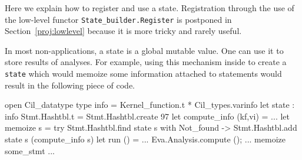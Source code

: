 Here we explain how to register and use a state. Registration through the use of
the low-level functor \texttt{State\_builder.Register} is postponed in
Section~\ref{proj:lowlevel} because it is more tricky and rarely useful.

In most non-\framac applications, a state is a global mutable value. One can use
it to store results of analyses. For example, using this mechanism inside
\framac to create a \texttt{state} which would memoize some
information attached to statements would result in the following piece of code.
 
 
\begin{ocamlcode}
open Cil_datatype
type info = Kernel_function.t * Cil_types.varinfo
let state : info Stmt.Hashtbl.t = Stmt.Hashtbl.create 97
let compute_info (kf,vi) = ...
let memoize s =
  try Stmt.Hashtbl.find state s
  with Not_found -> Stmt.Hashtbl.add state s (compute_info s)
let run () = ... Eva.Analysis.compute (); ... memoize some_stmt ...
\end{ocamlcode}

